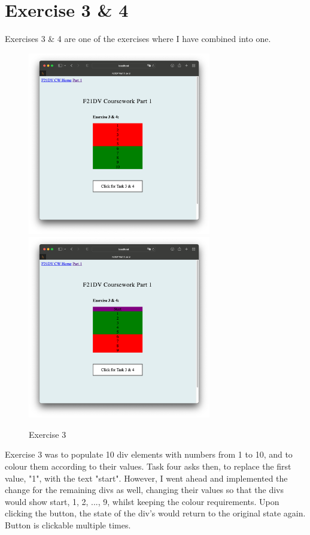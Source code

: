 \documentclass{scrreprt}
\begin{document}
\section{Exercise 3 \& 4}
Exercises 3 \& 4 are one of the exercises where I have combined into one.
\begin{figure}[!ht]
    \centering
    \includegraphics[width = 8cm]{images/ex3_1.png}
    \includegraphics[width = 8cm]{images/ex3_2.png}
    \label{fig:ex3}
    \caption{Exercise 3}
\end{figure}
\FloatBarrier
Exercise 3 was to populate 10 div elements with numbers from 1 to 10, and to colour them according to
their values. Task four asks then, to replace the first value, "1", with the text "start". However, I
went ahead and implemented the change for the remaining divs as well, changing their values so that
the divs would show start, 1, 2, ..., 9, whilst keeping the colour requirements. Upon clicking the
button, the state of the div's would return to the original state again. Button is clickable multiple times.
\end{document}
